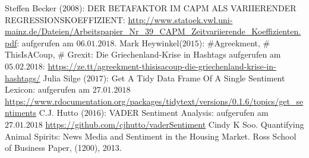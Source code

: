 
	\newpage
	\begin{thebibliography}{12345678}	
	 Steffen Becker ($2008$): DER BETAFAKTOR IM CAPM ALS VARIIERENDER REGRESSIONSKOEFFIZIENT: \url{http://www.statoek.vwl.uni-mainz.de/Dateien/Arbeitspapier_Nr_39_CAPM_Zeitvariierende_Koeffizienten.pdf}: aufgerufen am $06.01.2018$.
	 Mark Heywinkel($2015$): \#Agreekment, \# ThisIsACoup, \# Grexit: Die Griechenland-Krise in Hashtags
	aufgerufen am $05.02.2018$:  \url{https://ze.tt/agreekment-thisisacoup-die-griechenland-krise-in-hashtags/}
	 Julia Silge ($2017$): Get A Tidy Data Frame Of A Single Sentiment Lexicon: aufgerufen am $27.01.2018$ \url{https://www.rdocumentation.org/packages/tidytext/versions/0.1.6/topics/get_sentiments}
	 C.J. Hutto ($2016$): VADER Sentiment Analysis: aufgerufen am $27.01.2018$ \url{https://github.com/cjhutto/vaderSentiment}
	 Cindy K Soo. Quantifying Animal Spirits: News Media and Sentiment in the Housing Market. Ross School of Business Paper, (1200), 2013.
\end{thebibliography}
\clearpage